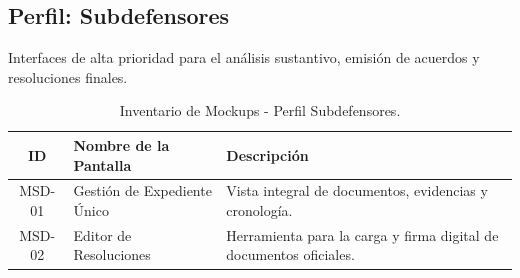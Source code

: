 \begin{appendices}
\newpage
\section{Perfil: Subdefensores}
Interfaces de alta prioridad para el análisis sustantivo, emisión de acuerdos y resoluciones finales.

\begin{table}[htbp]
    \centering
    \small
    \begin{tabular}{|c|l|p{7cm}|}
    \hline
    \textbf{ID} & \textbf{Nombre de la Pantalla} & \textbf{Descripción} \\ \hline
    MSD-01 & Gestión de Expediente Único & Vista integral de documentos, evidencias y cronología. \\ \hline
    MSD-02 & Editor de Resoluciones & Herramienta para la carga y firma digital de documentos oficiales. \\ \hline
    \end{tabular}
    \caption{Inventario de Mockups - Perfil Subdefensores.}
\end{table}

\end{appendices}